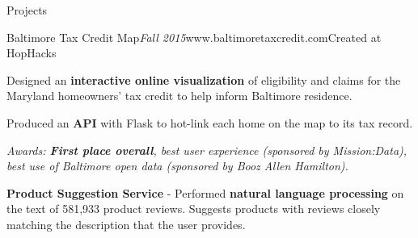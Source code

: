 \documentclass{resume} %
\begin{document}
\begin{rSection}{Projects}

	\begin{rSubsection}{Baltimore Tax Credit Map}{\em Fall 2015}{www.baltimoretaxcredit.com}{Created at HopHacks}
	
	\item Designed an \textbf{interactive online visualization} of eligibility and claims for the Maryland homeowners' tax credit to help inform Baltimore residence.
	\item Produced an \textbf{API} with Flask to hot-link each home on the map to its tax record.
	\item \em{Awards}: \em\textbf{First place overall}, best user experience (sponsored by Mission:Data), best use of Baltimore open data (sponsored by Booz Allen Hamilton).
	
	\end{rSubsection}


	\textbf{Product Suggestion Service} - Performed \textbf{natural language processing} on the text of 581,933 product reviews.
	Suggests products with reviews closely matching the description that the user provides.
	

	
\end{rSection}


%
%	
%
\end{document}
